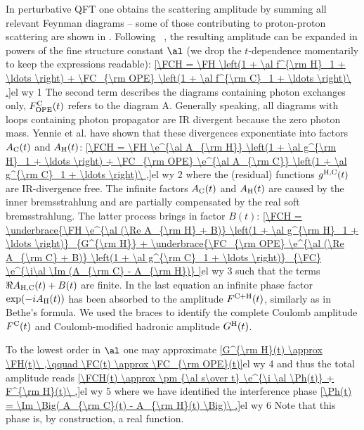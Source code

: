 
In perturbative QFT one obtains the scattering amplitude by summing all relevant Feynman diagrams -- some of those contributing to proton-proton scattering are shown in . Following \WaY\ , the resulting amplitude can be expanded in powers of the fine structure constant $\al$ (we drop the $t$-dependence momentarily to keep the expressions readable):
\eqref{\FCH = \FH \left(1 + \al f^{\rm H}_1 + \ldots \right) + \FC_{\rm OPE} \left(1 + \al f^{\rm C}_1 + \ldots \right)\ .}{el wy 1}
The second term describes the diagrams containing photon exchanges only, $F^{\rm C}_{\rm OPE}(t)$ refers to the diagram  A. Generally speaking, all diagrams with loops containing photon propagator are IR divergent because the zero photon mass. Yennie et al.  have shown that these divergences exponentiate into factors $A_{\rm C}(t)$ and $A_{\rm H}(t)$:
\eqref{\FCH = \FH \e^{\al A_{\rm H}} \left(1 + \al g^{\rm H}_1 + \ldots \right) + \FC_{\rm OPE} \e^{\al A_{\rm C}} \left(1 + \al g^{\rm C}_1 + \ldots \right)\ ,}{el wy 2}
where the (residual) functions $g^{\rm H, C}(t)$ are IR-divergence free. The infinite factors $A_{\rm C}(t)$ and $A_{\rm H}(t)$ are caused by the inner bremsstrahlung and are partially compensated by the real soft bremsstrahlung. The latter process brings in factor $B(t)$:
\eqref{\FCH =
\underbrace{\FH \e^{\al (\Re A_{\rm H} + B)} \left(1 + \al g^{\rm H}_1 + \ldots \right)}_{G^{\rm H}}
+
\underbrace{\FC_{\rm OPE} \e^{\al (\Re A_{\rm C} + B)} \left(1 + \al g^{\rm C}_1 + \ldots \right)}_{\FC}
\e^{\i\al \Im (A_{\rm C} - A_{\rm H})}
}{el wy 3}
such that the terms $\Re A_{\rm H, C}(t) + B(t)$ are finite. In the last equation an infinite phase factor $\exp(-iA_{\rm H}(t))$ has been absorbed to the amplitude $F^{\rm C+H}(t)$, similarly as in Bethe's formula. We used the braces to identify the complete Coulomb amplitude $F^{\rm C}(t)$ and Coulomb-modified hadronic amplitude $G^{\rm H}(t)$.

To the lowest order in $\al$ one may approximate
\eqref{G^{\rm H}(t) \approx \FH(t)\ ,\qquad \FC(t) \approx \FC_{\rm OPE}(t)}{el wy 4}
and thus the total amplitude reads
\eqref{\FCH(t) \approx \pm {\al s\over t} \e^{\i \al \Ph(t)} + F^{\rm H}(t)\ ,}{el wy 5}
where we have identified the interference phase
\eqref{\Ph(t) = \Im \Big( A_{\rm C}(t) - A_{\rm H}(t) \Big)\ .}{el wy 6}
Note that this phase is, by construction, a real function.


